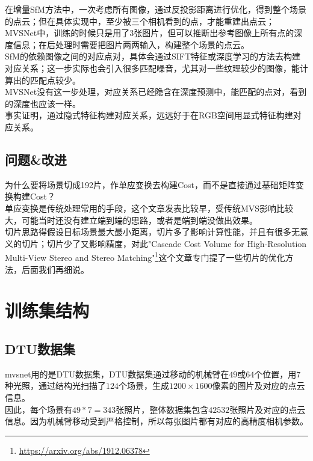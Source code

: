 	在增量SfM方法中，一次考虑所有图像，通过反投影距离进行优化，得到整个场景的点云；但在具体实现中，至少被三个相机看到的点，才能重建出点云；\\

	MVSNet中，训练的时候只是用了3张图片，但可以推断出参考图像上所有点的深度信息；在后处理时需要把图片两两输入，构建整个场景的点云。\\

	SfM的依赖图像之间的对应点对，具体会通过SIFT特征或深度学习的方法去构建对应关系；这一步实际也会引入很多匹配噪音，尤其对一些纹理较少的图像，能计算出的匹配点较少。\\

	MVSNet没有这一步处理，对应关系已经隐含在深度预测中，能匹配的点对，看到的深度也应该一样。\\

	事实证明，通过隐式特征构建对应关系，远远好于在RGB空间用显式特征构建对应关系。

\subsection{问题\&改进}
	为什么要将场景切成192片，作单应变换去构建Cost，而不是直接通过基础矩阵变换构建Cost？\\

	单应变换是传统处理常用的手段，这个文章发表比较早，受传统MVS影响比较大，可能当时还没有建立端到端的思路，或者是端到端没做出效果。\\

	切片思路得假设目标场景最大最小距离，切片多了影响计算性能，并且有很多无意义的切片；切片少了又影响精度，对此"Cascade Cost Volume for High-Resolution Multi-View Stereo and Stereo Matching"\footnote{\url{https://arxiv.org/abs/1912.06378}}这个文章专门提了一些切片的优化方法，后面我们再细说。

\section{训练集结构}
	
	\subsection*{DTU数据集} 
		mvsnet用的是DTU数据集，DTU数据集通过移动的机械臂在$49$或$64$个位置，用$7$种光照，通过结构光扫描了$124$个场景，生成$1200 \times 1600$像素的图片及对应的点云信息。\\

		因此，每个场景有$49 * 7 = 343$张照片，整体数据集包含$42532$张照片及对应的点云信息。因为机械臂移动受到严格控制，所以每张图片都有对应的高精度相机参数。\\

